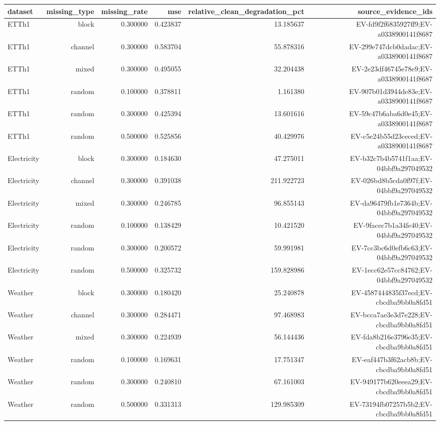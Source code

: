 \begin{tabular}{lrrrrr}
\hline
dataset & missing\_type & missing\_rate & mse & relative\_clean\_degradation\_pct & source\_evidence\_ids \\
\hline
ETTh1 & block & 0.300000 & 0.423837 & 13.185637 & EV-fd9f2f6835927ff9;EV-a0338900141f8687 \\
ETTh1 & channel & 0.300000 & 0.583704 & 55.878316 & EV-299e747dcb0dadac;EV-a0338900141f8687 \\
ETTh1 & mixed & 0.300000 & 0.495055 & 32.204438 & EV-2e23df46745e78e9;EV-a0338900141f8687 \\
ETTh1 & random & 0.100000 & 0.378811 & 1.161380 & EV-907b01d3944de83e;EV-a0338900141f8687 \\
ETTh1 & random & 0.300000 & 0.425394 & 13.601616 & EV-59c47b6aba6d0e45;EV-a0338900141f8687 \\
ETTh1 & random & 0.500000 & 0.525856 & 40.429976 & EV-c5e24b55d23ceced;EV-a0338900141f8687 \\
Electricity & block & 0.300000 & 0.184630 & 47.275011 & EV-b32c7b4b5741f1aa;EV-04bbf9a297049532 \\
Electricity & channel & 0.300000 & 0.391038 & 211.922723 & EV-026bd8b5cda0f97f;EV-04bbf9a297049532 \\
Electricity & mixed & 0.300000 & 0.246785 & 96.855143 & EV-da96479fb1e7364b;EV-04bbf9a297049532 \\
Electricity & random & 0.100000 & 0.138429 & 10.421520 & EV-9facec7b1a34fe40;EV-04bbf9a297049532 \\
Electricity & random & 0.300000 & 0.200572 & 59.991981 & EV-7cc3bc6d0efb6c63;EV-04bbf9a297049532 \\
Electricity & random & 0.500000 & 0.325732 & 159.828986 & EV-1ecc62e57cc84762;EV-04bbf9a297049532 \\
Weather & block & 0.300000 & 0.180420 & 25.240878 & EV-4587444835f37ecd;EV-cbcdba9bb0a8fd51 \\
Weather & channel & 0.300000 & 0.284471 & 97.468983 & EV-bcca7ae3e3d7e228;EV-cbcdba9bb0a8fd51 \\
Weather & mixed & 0.300000 & 0.224939 & 56.144436 & EV-fda8b216e3796e35;EV-cbcdba9bb0a8fd51 \\
Weather & random & 0.100000 & 0.169631 & 17.751347 & EV-eaf447b3f62acb8b;EV-cbcdba9bb0a8fd51 \\
Weather & random & 0.300000 & 0.240810 & 67.161003 & EV-949177b620eeea29;EV-cbcdba9bb0a8fd51 \\
Weather & random & 0.500000 & 0.331313 & 129.985309 & EV-73194fb07257b5b2;EV-cbcdba9bb0a8fd51 \\
\hline
\end{tabular}
